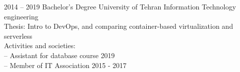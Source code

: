 \documentclass[9pt]{developercv}
\begin{document}
\begin{entrylist}
	\entry
	{2014 -- 2019}
	{Bachelor's Degree}
	{University of Tehran}
	{
		Information Technology engineering \\
		Thesis: Intro to DevOps, and comparing container-based virtualization and serverless \\
		Activities and societies: \\
		-- Assistant for database course 2019 \\
		-- Member of IT Association 2015 - 2017 \\
	}
\end{entrylist}




\end{document}
